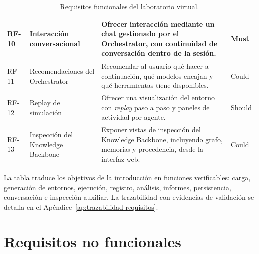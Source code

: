 \begin{table}[H]
\begin{center}
\begin{tabular}{|>{\raggedright\arraybackslash}p{1.08cm}|>{\raggedright\arraybackslash}p{2.45cm}|>{\raggedright\arraybackslash}p{5.92cm}|>{\raggedright\arraybackslash}p{0.95cm}|}
RF-10 & Interacción conversacional & Ofrecer interacción mediante un chat gestionado por el Orchestrator, con continuidad de conversación dentro de la sesión. & Must \\ \hline
RF-11 & Recomendaciones del Orchestrator & Recomendar al usuario qué hacer a continuación, qué modelos encajan y qué herramientas tiene disponibles. & Could \\ \hline
RF-12 & Replay de simulación & Ofrecer una visualización del entorno con \textit{replay} paso a paso y paneles de actividad por agente. & Should \\ \hline
RF-13 & Inspección del Knowledge Backbone & Exponer vistas de inspección del Knowledge Backbone, incluyendo grafo, memorias y procedencia, desde la interfaz web. & Could \\ \hline
\end{tabular}
\caption[Requisitos funcionales]{Requisitos funcionales del laboratorio virtual.}
\label{tab:requisitos-funcionales}
\end{center}
\end{table}

La tabla traduce los objetivos de la introducción en funciones verificables:
carga, generación de entornos, ejecución, registro, análisis, informes,
persistencia, conversación e inspección auxiliar. La trazabilidad con evidencias
de validación se detalla en el Apéndice~\ref{ap:trazabilidad-requisitos}.

\section{Requisitos no funcionales}

